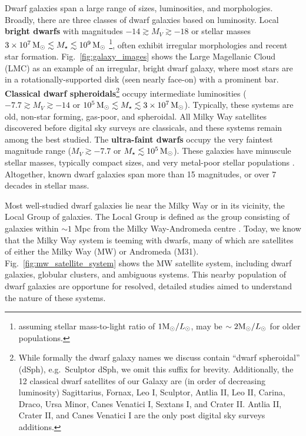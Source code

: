 Dwarf galaxies span a large range of sizes, luminosities, and
morphologies. Broadly, there are three classes of dwarf galaxies based
on luminosity. Local \textbf{bright dwarfs} with magnitudes
\(-14 \gtrsim M_V \gtrsim  -18\) or stellar masses
\(3\times10^7\,{\rm M}_{\odot} \lesssim M_\star \lesssim 10^9\,{\rm M}_{\odot}\) \footnote{assuming
  stellar mass-to-light ratio of \(1 {\rm M}_{\odot} / L_{\odot}\), may be
  \(\sim 2 {\rm M}_{\odot}/L_\odot\) for older populations.}, often exhibit
irregular morphologies and recent star formation.
Fig.~\ref{fig:galaxy_images} shows the Large Magellanic Cloud (LMC) as
an example of an irregular, bright dwarf galaxy, where most stars are in
a rotationally-supported disk (seen nearly face-on) with a prominent
bar. \textbf{Classical dwarf spheroidals}\footnote{While formally the
  dwarf galaxy names we discuss contain ``dwarf spheroidal'' (dSph),
  e.g.~Sculptor dSph, we omit this suffix for brevity. Additionally, the
  12 classical dwarf satellites of our Galaxy are (in order of
  decreasing luminosity) Sagittarius, Fornax, Leo I, Sculptor, Antlia
  II, Leo II, Carina, Draco, Ursa Minor, Canes Venatici I, Sextans I,
  and Crater II. Antlia II, Crater II, and Canes Venatici I are the only
  post digital sky surveys additions.} occupy intermediate luminosities
( \(-7.7 \gtrsim M_V  \gtrsim -14\) or
\(10^5\,{\rm M}_{\odot} \lesssim M_\star \lesssim 3\times10^7\,{\rm M}_{\odot}\)). Typically,
these systems are old, non-star forming, gas-poor, and spheroidal. All
Milky Way satellites discovered before digital sky surveys are
classicals, and these systems remain among the best studied. The
\textbf{ultra-faint dwarfs} occupy the very faintest magnitude range
(\(M_V \gtrsim -7.7\) or \(M_\star \lesssim 10^5\,{\rm M}_{\odot}\)). These galaxies
have minuscule stellar masses, typically compact sizes, and very
metal-poor stellar populations \citep[see the review by][]{simon2019}.
Altogether, known dwarf galaxies span more than 15 magnitudes, or over 7
decades in stellar mass.

Most well-studied dwarf galaxies lie near the Milky Way or in its
vicinity, the Local Group of galaxies. The Local Group is defined as the
group consisting of galaxies within \(\sim 1\) Mpc from the Milky
Way-Andromeda centre \citep[e.g.,][ and references
therein]{mcconnachie2012}. Today, we know that the Milky Way system is
teeming with dwarfs, many of which are satellites of either the Milky
Way (MW) or Andromeda (M31). Fig.~\ref{fig:mw_satellite_system} shows
the MW satellite system, including dwarf galaxies, globular clusters,
and ambiguous systems. This nearby population of dwarf galaxies are
opportune for resolved, detailed studies aimed to understand the nature
of these systems.


